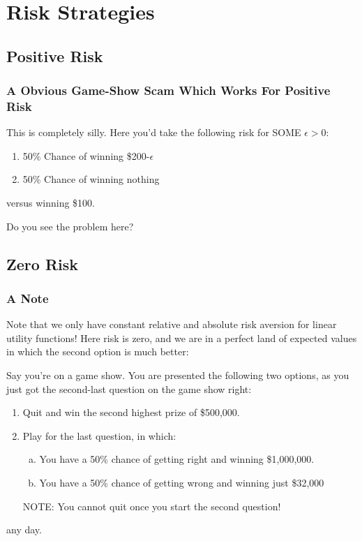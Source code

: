 \documentclass{beamer}
\begin{document}
\section{Risk Strategies}
    \subsection{Positive Risk}
        \begin{frame}
            \frametitle{A Obvious Game-Show Scam Which Works For Positive Risk}
                This is completely silly. Here you'd take the following risk for SOME $\epsilon>0$:
                \begin{example}
                    \begin{enumerate}
                        \item 50\% Chance of winning \$200-$\epsilon$
                        \item 50\% Chance of winning nothing
                    \end{enumerate} \pause
                    versus winning \$100. \\
                \end{example}
                \pause Do you see the problem here?
                
        \end{frame}
    \subsection{Zero Risk}
        \begin{frame}
            \frametitle{A Note}
                Note that we only have constant relative and absolute risk aversion for linear utility functions! Here risk is zero, and we are in a perfect land of
                expected values in which the second option is much better:
                \begin{example}
                    Say you're on a game show. You are presented the following two options, as you just got the second-last question on the game show right: \pause
                \begin{enumerate}
                    \item Quit and win the second highest prize of \$500,000. \pause
                    \item Play for the last question, in which: 
                    \pause
                    \begin{enumerate}[a)]                    
                        \item You have a 50\% chance of getting right and winning \$1,000,000.
                        \item You have a 50\% chance of getting wrong and winning just \$32,000 
                    \end{enumerate} 
                    \pause NOTE: You cannot quit once you start the second question!
                \end{enumerate} 
                \end{example}
                any day.
        \end{frame}
\end{document}
